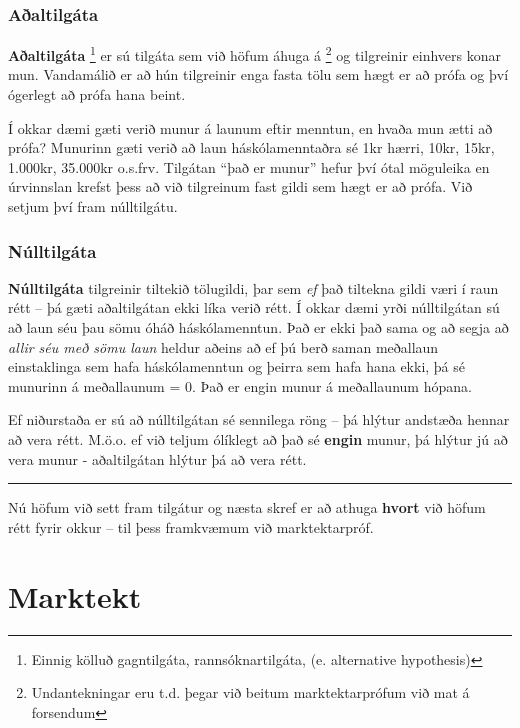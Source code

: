 \documentclass[
]{book}
\begin{document}
\hypertarget{auxf0altilguxe1ta}{%
\subsection{Aðaltilgáta}\label{auxf0altilguxe1ta}}

\textbf{Aðaltilgáta} \footnote{Einnig kölluð gagntilgáta, rannsóknartilgáta, (e.
  alternative hypothesis)} er sú tilgáta sem við höfum áhuga
á \footnote{Undantekningar eru t.d. þegar við beitum marktektarprófum við mat á forsendum} og tilgreinir einhvers konar mun. Vandamálið er að hún tilgreinir enga
fasta tölu sem hægt er að prófa og því ógerlegt að prófa hana beint.

Í okkar dæmi gæti verið munur á launum eftir menntun, en hvaða mun ætti
að prófa? Munurinn gæti verið að laun háskólamenntaðra sé 1kr hærri,
10kr, 15kr, 1.000kr, 35.000kr o.s.frv. Tilgátan ``það er munur'' hefur því
ótal möguleika en úrvinnslan krefst þess að við tilgreinum fast gildi
sem hægt er að prófa. Við setjum því fram núlltilgátu.

\hypertarget{nuxfalltilguxe1ta}{%
\subsection{Núlltilgáta}\label{nuxfalltilguxe1ta}}

\textbf{Núlltilgáta} tilgreinir tiltekið tölugildi, þar sem \emph{ef} það tiltekna
gildi væri í raun rétt -- þá gæti aðaltilgátan ekki líka verið rétt. Í
okkar dæmi yrði núlltilgátan sú að laun séu þau sömu óháð
háskólamenntun. Það er ekki það sama og að segja að \emph{allir séu með sömu
laun} heldur aðeins að ef þú berð saman meðallaun einstaklinga sem hafa
háskólamenntun og þeirra sem hafa hana ekki, þá sé munurinn á
meðallaunum = 0. Það er engin munur á meðallaunum hópana.

Ef niðurstaða er sú að núlltilgátan sé sennilega röng -- þá hlýtur
andstæða hennar að vera rétt. M.ö.o. ef við teljum ólíklegt að það sé
\textbf{engin} munur, þá hlýtur jú að vera munur - aðaltilgátan hlýtur þá að
vera rétt.

\begin{center}\rule{0.5\linewidth}{0.5pt}\end{center}

Nú höfum við sett fram tilgátur og næsta skref er að athuga \textbf{hvort}
við höfum rétt fyrir okkur -- til þess framkvæmum við marktektarpróf.

\hypertarget{marktekt}{%
\chapter{Marktekt}\label{marktekt}}
\end{document}
